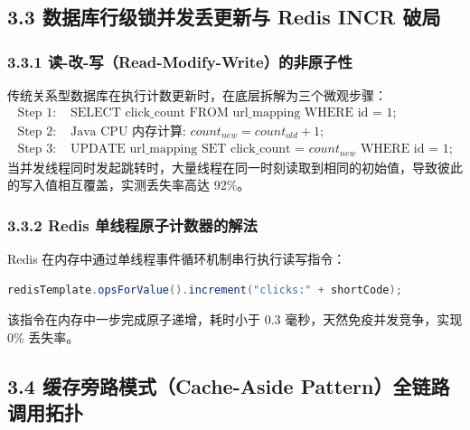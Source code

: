 \documentclass[11pt,a4paper]{ctexart}
\begin{document}
\subsection{3.3 数据库行级锁并发丢更新与 Redis INCR 破局}

\subsubsection{3.3.1 读-改-写（Read-Modify-Write）的非原子性}
传统关系型数据库在执行计数更新时，在底层拆解为三个微观步骤：
\begin{align*}
\text{Step 1: } & \text{SELECT click\_count FROM url\_mapping WHERE id = 1;} \\
\text{Step 2: } & \text{Java CPU 内存计算: } count_{new} = count_{old} + 1; \\
\text{Step 3: } & \text{UPDATE url\_mapping SET click\_count = } count_{new} \text{ WHERE id = 1;}
\end{align*}
当并发线程同时发起跳转时，大量线程在同一时刻读取到相同的初始值，导致彼此的写入值相互覆盖，实测丢失率高达 92\%。

\subsubsection{3.3.2 Redis 单线程原子计数器的解法}
Redis 在内存中通过单线程事件循环机制串行执行读写指令：
\begin{lstlisting}[language=Java]
redisTemplate.opsForValue().increment("clicks:" + shortCode);
\end{lstlisting}
该指令在内存中一步完成原子递增，耗时小于 0.3 毫秒，天然免疫并发竞争，实现 0\% 丢失率。

\subsection{3.4 缓存旁路模式（Cache-Aside Pattern）全链路调用拓扑}
\end{document}
